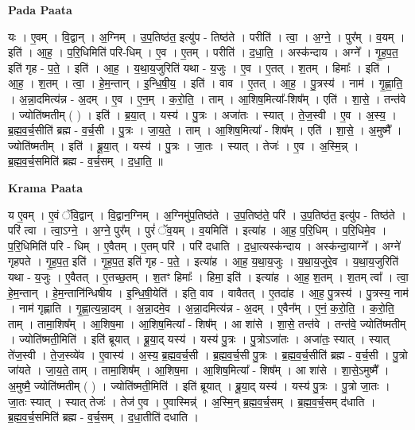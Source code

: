 \documentclass[17pt]{extarticle}
\begin{document}
\textbf{Pada Paata} \newline

यः । ए॒वम् । वि॒द्वान् । अ॒ग्निम् । उ॒प॒तिष्ठ॑त॒ इत्यु॑प - तिष्ठ॑ते । परीति॑ । त्वा॒ । अ॒ग्ने॒ । पुर᳚म् । व॒यम् । इति॑ । आ॒ह॒ । प॒रि॒धिमिति॑ परि-धिम् । ए॒व । ए॒तम् । परीति॑ । द॒धा॒ति॒ । अस्क॑न्दाय । अग्ने᳚ । गृ॒ह॒प॒त॒ इति॑ गृह - प॒ते॒ । इति॑ । आ॒ह॒ । य॒था॒य॒जुरिति॑ यथा - य॒जुः । ए॒व । ए॒तत् । श॒तम् । हिमाः᳚ । इति॑ । आ॒ह॒ । श॒तम् । त्वा॒ । हे॒म॒न्तान् । इ॒न्धि॒षी॒य॒ । इति॑ । वाव । ए॒तत् । आ॒ह॒ । पु॒त्रस्य॑ । नाम॑ । गृ॒ह्णा॒ति॒ । अ॒न्ना॒दमित्य॑न्न - अ॒दम् । ए॒व । ए॒न॒म् । क॒रो॒ति॒ । ताम् । आ॒शिष॒मित्या᳚-शिष᳚म् । एति॑ । शा॒से॒ । तन्त॑वे । ज्योति॑ष्मतीम् ( ) । इति॑ । ब्र॒या॒त् । यस्य॑ । पु॒त्रः । अजा॑तः । स्यात् । ते॒ज॒स्वी । ए॒व । अ॒स्य॒ । ब्र॒ह्म॒व॒र्च॒सीति॑ ब्रह्म - व॒र्च॒सी । पु॒त्रः । जा॒य॒ते॒ । ताम् । आ॒शिष॒मित्या᳚ - शिष᳚म् । एति॑ । शा॒से॒ । अ॒मुष्मै᳚ । ज्योति॑ष्मतीम् । इति॑ । ब्रू॒या॒त् । यस्य॑ । पु॒त्रः । जा॒तः । स्यात् । तेजः॑ । ए॒व । अ॒स्मि॒न्न् । ब्र॒ह्म॒व॒र्च॒समिति॑ ब्रह्म - व॒र्च॒सम् । द॒धा॒ति॒ ॥  \newline


\textbf{Krama Paata} \newline

य ए॒वम् । ए॒वं ॅवि॒द्वान् । वि॒द्वान॒ग्निम् । अ॒ग्निमु॑प॒तिष्ठ॑ते । उ॒प॒तिष्ठ॑ते॒ परि॑ । उ॒प॒तिष्ठ॑त॒ इत्यु॑प - तिष्ठ॑ते । परि॑ त्वा । त्वा॒ऽग्ने॒ । अ॒ग्ने॒ पुर᳚म् । पुरं॑ ॅव॒यम् । व॒यमिति॑ । इत्या॑ह । आ॒ह॒ प॒रि॒धिम् । प॒रि॒धिमे॒व । प॒रि॒धिमिति॑ परि - धिम् । ए॒वैतम् । ए॒तम् परि॑ । परि॑ दधाति । द॒धा॒त्यस्क॑न्दाय । अस्क॑न्दा॒याग्ने᳚ । अग्ने॑ गृहपते । गृ॒ह॒प॒त॒ इति॑ । गृ॒ह॒प॒त॒ इति॑ गृह - प॒ते॒ । इत्या॑ह । आ॒ह॒ य॒था॒य॒जुः । य॒था॒य॒जुरे॒व । य॒था॒य॒जुरिति॑ यथा - य॒जुः । ए॒वैतत् । ए॒तच्छ॒तम् । श॒तꣳ हिमाः᳚ । हिमा॒ इति॑ । इत्या॑ह । आ॒ह॒ श॒तम् । श॒तम् त्वा᳚ । त्वा॒ हे॒म॒न्तान् । हे॒म॒न्तानि॑न्धिषीय । इ॒न्धि॒षी॒येति॑ । इति॒ वाव । वावैतत् । ए॒तदा॑ह । आ॒ह॒ पु॒त्रस्य॑ । पु॒त्रस्य॒ नाम॑ । नाम॑ गृह्णाति । गृ॒ह्णा॒त्य॒न्ना॒दम् । अ॒न्ना॒दमे॒व । अ॒न्ना॒दमित्य॑न्न - अ॒दम् । ए॒वैन᳚म् । ए॒नं॒ क॒रो॒ति॒ । क॒रो॒ति॒ ताम् । तामा॒शिष᳚म् । आ॒शिष॒मा । आ॒शिष॒मित्या᳚ - शिष᳚म् । आ शा॑से । शा॒से॒ तन्त॑वे । तन्त॑वे॒ ज्योति॑ष्मतीम् । ज्योति॑ष्मती॒मिति॑ । इति॑ ब्रूयात् । ब्रू॒या॒द् यस्य॑ । यस्य॑ पु॒त्रः । पु॒त्रोऽजा॑तः । अजा॑तः॒ स्यात् । स्यात् ते॑ज॒स्वी । ते॒ज॒स्व्ये॑व । ए॒वास्य॑ । अ॒स्य॒ ब्र॒ह्म॒व॒र्च॒सी । ब्र॒ह्म॒व॒र्च॒सी पु॒त्रः । ब्र॒ह्म॒व॒र्च॒सीति॑ ब्रह्म - व॒र्च॒सी । पु॒त्रो जा॑यते । जा॒य॒ते॒ ताम् । तामा॒शिष᳚म् । आ॒शिष॒मा । आ॒शिष॒मित्या᳚ - शिष᳚म् । आ शा॑से । शा॒से॒ऽमुष्मै᳚ । अ॒मुष्मै॒ ज्योति॑ष्मतीम् ( ) । ज्योति॑ष्मती॒मिति॑ । इति॑ ब्रूयात् । ब्रू॒या॒द् यस्य॑ । यस्य॑ पु॒त्रः । पु॒त्रो जा॒तः । जा॒तः स्यात् । स्यात् तेजः॑ । तेज॑ ए॒व । ए॒वास्मिन्न्॑ । अ॒स्मि॒न् ब्र॒ह्म॒व॒र्च॒सम् । ब्र॒ह्म॒व॒र्च॒सम् द॑धाति । ब्र॒ह्म॒व॒र्च॒समिति॑ ब्रह्म - व॒र्च॒सम् । द॒धा॒तीति॑ दधाति । \newline
\end{document}
